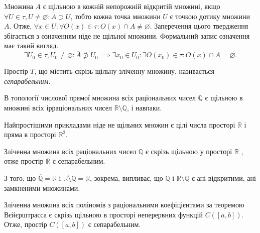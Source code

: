 \documentclass[a4paper, 12pt]{article}
\newcommand{\RR}{\mathbb{R}}
\newcommand{\QQ}{\mathbb{Q}}
\renewcommand{\emptyset}{\varnothing}
\begin{document}
Mножина $A$ є щільною в кожній непорожній відкритій
множині, якщо $\forall U \in \tau, U \ne \emptyset: \overline{A} \supset U$, тобто кожна точка
множини $U$ є точкою дотику множини $A$. Отже,
$\forall x \in U: \forall O(x) \in \tau: O(x) \cap A \ne \emptyset$. Заперечення цього
твердження збігається з означенням ніде не щільної
множини. Формальний запис означення має такий вигляд.
\[ \exists U_0 \in \tau, U_0 \ne \emptyset: \overline{A} \not \supset U_0 \implies \exists x_0 \in U_0: \exists O(x_0) \in \tau: O(x) \cap A = \emptyset. \]

\begin{definition}
	Простір $T$, що містить скрізь щільну зліченну
	множину, називається \textit{сепарабельним}.
\end{definition}

\begin{example}
	В топології числової прямої множина всіх
	раціональних чисел $\QQ$ є щільною в множині всіх
	ірраціональних чисел $\RR \setminus \QQ$, і навпаки.
\end{example}

\begin{example}
	Найпростішими прикладами ніде не
	щільних множин є цілі числа просторі $\RR$ і пряма в просторі
	$\RR^2$.
\end{example}

\begin{example}
	Зліченна множина всіх раціональних чисел
	$\QQ$ є скрізь щільною у просторі $\RR$ , отже простір $\RR$ є
	сепарабельним.
\end{example}

З того, що $\overline{\QQ} = \RR$ і $\overline{\RR \setminus \QQ} =\RR$, зокрема, випливає, що $\QQ$ і
$\RR \setminus \QQ$ є ані відкритими, ані замкненими множинами.

\begin{example}
	Зліченна множина всіх поліномів з
	раціональними коефіцієнтами за теоремою Вєйєрштрасса є
	скрізь щільною в просторі неперервних функцій $C([a,b])$.
	Отже, простір $C([a,b])$ є сепарабельним. 
\end{example}
\end{document}
